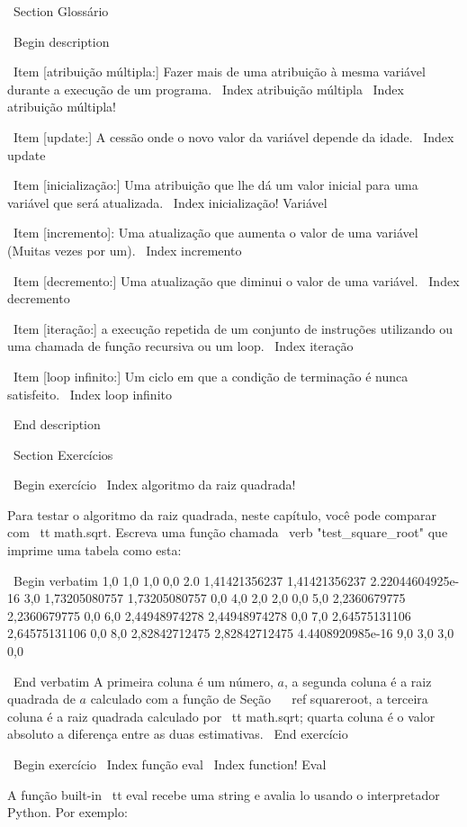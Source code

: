 \documentclass[10pt]{book}
\begin{document}
\begin {itemize}
{{{{\ Section {} Glossário

\ Begin {description}

\ Item [atribuição múltipla:] Fazer mais de uma atribuição à mesma
variável durante a execução de um programa.
\ Index {atribuição múltipla}
\ Index {atribuição múltipla!}

\ Item [update:] A cessão onde o novo valor da variável
depende da idade.
\ Index {update}

\ Item [inicialização:] Uma atribuição que lhe dá um valor inicial para
uma variável que será atualizada.
\ Index {inicialização! Variável}

\ Item [incremento]: Uma atualização que aumenta o valor de uma variável
(Muitas vezes por um).
\ Index {incremento}

\ Item [decremento:] Uma atualização que diminui o valor de uma variável.
\ Index {} decremento

\ Item [iteração:] a execução repetida de um conjunto de instruções utilizando
ou uma chamada de função recursiva ou um loop.
\ Index {iteração}

\ Item [loop infinito:] Um ciclo em que a condição de terminação é
nunca satisfeito.
\ Index {loop infinito}

\ End {description}


\ Section {Exercícios}

\ Begin {} exercício
\ Index {algoritmo da raiz quadrada!}

Para testar o algoritmo da raiz quadrada, neste capítulo, você pode comparar
com {\ tt math.sqrt}. Escreva uma função chamada \ verb "test_square_root"
que imprime uma tabela como esta:

\ Begin {verbatim}
1,0 1,0 1,0 0,0
2.0 1,41421356237 1,41421356237 2.22044604925e-16
3,0 1,73205080757 1,73205080757 0,0
4,0 2,0 2,0 0,0
5,0 2,2360679775 2,2360679775 0,0
6,0 2,44948974278 2,44948974278 0,0
7,0 2,64575131106 2,64575131106 0,0
8,0 2,82842712475 2,82842712475 4.4408920985e-16
9,0 3,0 3,0 0,0

\ End {verbatim}
%
A primeira coluna é um número, $ a $, a segunda coluna é
a raiz quadrada de $ a $ calculado com a função de
Seção ~ \ ref {} squareroot, a terceira coluna é a raiz quadrada calculado
por {\ tt math.sqrt}; quarta coluna é o valor absoluto
a diferença entre as duas estimativas.
\ End {} exercício


\ Begin {} exercício
\ Index {função eval}
\ Index {function! Eval}

A função built-in {\ tt eval} recebe uma string e avalia
lo usando o interpretador Python. Por exemplo:

}}}}
\end{itemize}
\end{document}
